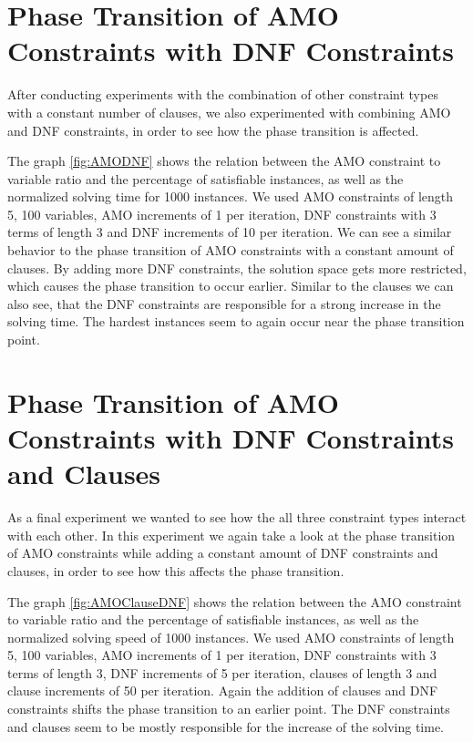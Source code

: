 \section{Phase Transition of AMO Constraints with DNF Constraints}

After conducting experiments with the combination of other constraint types with a constant number of clauses, we also experimented with combining AMO and DNF constraints, in order to see how the phase transition is affected.



The graph \ref{fig:AMODNF} shows the relation between the AMO constraint to variable ratio and the percentage of satisfiable instances, as well as the normalized solving time for 1000 instances. We used AMO constraints of length 5, 100 variables, AMO increments of 1 per iteration, DNF constraints with 3 terms of length 3 and DNF increments of 10 per iteration. We can see a similar behavior to the phase transition of AMO constraints with a constant amount of clauses. By adding more DNF constraints, the solution space gets more restricted, which causes the phase transition to occur earlier. Similar to the clauses we can also see, that the DNF constraints are responsible for a strong increase in the solving time. The hardest instances seem to again occur near the phase transition point.

\section{Phase Transition of AMO Constraints with DNF Constraints and Clauses}

As a final experiment we wanted to see how the all three constraint types interact with each other. In this experiment we again take a look at the phase transition of AMO constraints while adding a constant amount of DNF constraints and clauses, in order to see how this affects the phase transition.




The graph \ref{fig:AMOClauseDNF} shows the relation between the AMO constraint to variable ratio and the percentage of satisfiable instances, as well as the normalized solving speed of 1000 instances. We used AMO constraints of length 5, 100 variables, AMO increments of 1 per iteration, DNF constraints with 3 terms of length 3, DNF increments of 5 per iteration, clauses of length 3 and clause increments of 50 per iteration. Again the addition of clauses and DNF constraints shifts the phase transition to an earlier point. The DNF constraints and clauses seem to be mostly responsible for the increase of the solving time.

